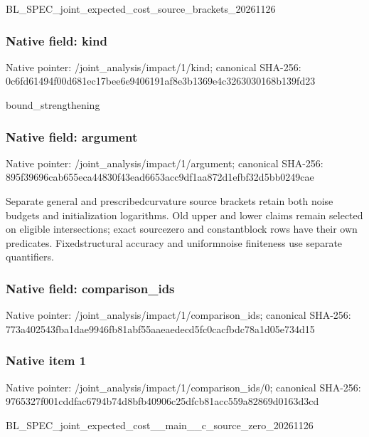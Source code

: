 \documentclass[10pt,a4paper]{article}
\begin{document}
BL\_SPEC\_joint\_expected\_c\allowbreak{}ost\_source\_brackets\_2026\allowbreak{}1126


\subsubsection{Native field: kind}


Native pointer: /joint\_analysis/impact/1/kind; canonical SHA-256: 0c6fd61494f00d681ec17bee\allowbreak{}6e9406191af8e3b1369e4c32\allowbreak{}63030168b139fd23


bound\_strengthening


\subsubsection{Native field: argument}


Native pointer: /joint\_analysis/impact/1/argument; canonical SHA-256: 895f39696cab655eca44830f\allowbreak{}43ead6653acc9df1aa872d1e\allowbreak{}fbf32d5bb0249cae


Separate general and prescribedcurvature source brackets retain both noise budgets and initialization logarithms. Old upper and lower claims remain selected on eligible intersections; exact sourcezero and constantblock rows have their own predicates. Fixedstructural accuracy and uniformnoise finiteness use separate quantifiers.


\subsubsection{Native field: comparison\_ids}


Native pointer: /joint\_analysis/impact/1/comparison\_ids; canonical SHA-256: 773a402543fba1dae9946fb8\allowbreak{}1abf55aaeaedecd5fc0cacfb\allowbreak{}dc78a1d05e734d15



\subsubsection{Native item 1}


Native pointer: /joint\_analysis/impact/1\allowbreak{}/comparison\_ids/0; canonical SHA-256: 9765327f001cddfac6794b74\allowbreak{}d8bfb40906c25dfcb81acc55\allowbreak{}9a82869d0163d3cd


BL\_SPEC\_joint\_expected\_c\allowbreak{}ost\_\_main\_\_c\_source\_zero\allowbreak{}\_20261126
\end{document}
